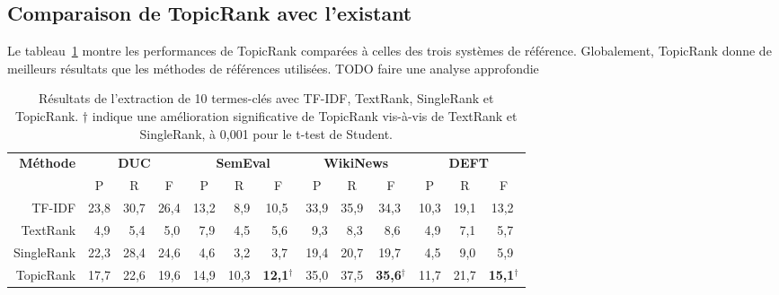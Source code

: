   \subsection{Comparaison de TopicRank avec l'existant}
  \label{subsec:comparaison_de_topicrank_avec_l_existant}
    Le tableau~\ref{tab:resultats_globaux} montre les performances de TopicRank
    comparées à celles des trois systèmes de référence.
    Globalement, TopicRank donne de meilleurs résultats que les méthodes de
    références utilisées.
    TODO faire une analyse approfondie
    \begin{table}
      \centering
      \begin{tabular}{@{~}r@{~~}c@{~~}c@{~~}c@{~~}c@{~~}c@{~~}c@{~~}c@{~~}c@{~~}c@{~~}c@{~~}c@{~~}c@{~}}
        \toprule
        \multirow{2}{*}[-2pt]{\textbf{Méthode}} & \multicolumn{3}{c}{\textbf{DUC}} & \multicolumn{3}{c}{\textbf{SemEval}} & \multicolumn{3}{c}{\textbf{WikiNews}} & \multicolumn{3}{c}{\textbf{DEFT}}\\
        \cmidrule(r){2-4}\cmidrule(r){5-7}\cmidrule(r){8-10}\cmidrule{11-13}
        & P & R & F & P & R & F & P & R & F & P & R & F\\
        \midrule
        TF-IDF & 23,8 & 30,7 & 26,4 & 13,2 & $~~$8,9 & 10,5$^{~}$ & 33,9 & 35,9 & 34,3$^{~}$ & 10,3 & 19,1 & 13,2$^{~}$\\
        TextRank & $~~$4,9 & $~~$5,4 & $~~$5,0 & $~~$7,9 & $~~$4,5 & $~~$5,6$^{~}$ & $~~$9,3 & $~~$8,3 & $~~$8,6$^{~}$ & $~~$4,9 & $~~$7,1 & $~~$5,7$^{~}$\\
        SingleRank & 22,3 & 28,4 & 24,6 & $~~$4,6 & $~~$3,2 & $~~$3,7$^{~}$ & 19,4 & 20,7 & 19,7$^{~}$ & $~~$4,5 & $~~$9,0 & $~~$5,9$^{~}$\\
        TopicRank & 17,7 & 22,6 & 19,6 & 14,9 & 10,3 & \textbf{12,1}$^\dagger$ & 35,0 & 37,5 & \textbf{35,6}$^\dagger$ & 11,7 & 21,7 & \textbf{15,1}$^\dagger$\\
        \bottomrule
      \end{tabular}
      \caption{Résultats de l'extraction de 10 termes-clés avec TF-IDF,
               TextRank, SingleRank et TopicRank. $\dagger$ indique une
               amélioration significative de TopicRank vis-à-vis de TextRank et
               SingleRank, à 0,001 pour le t-test de Student.
               \label{tab:resultats_globaux}}
    \end{table}

